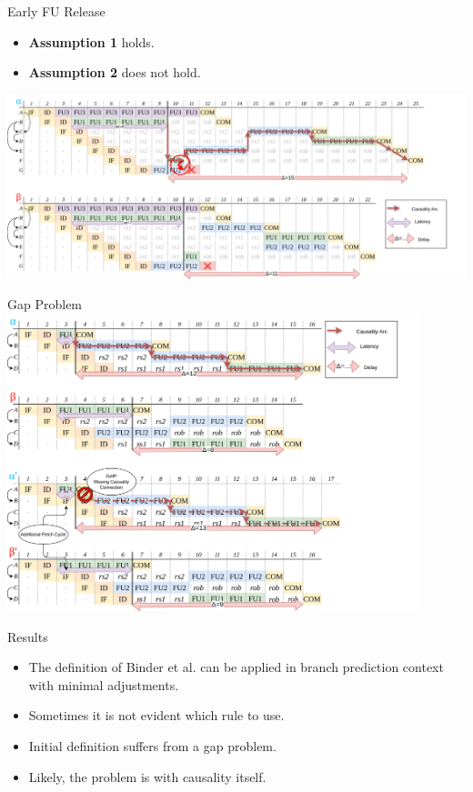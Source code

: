 \documentclass{beamer}
\begin{document}
\begin{frame}{Early FU Release}
    \begin{itemize}
        \item \textbf{Assumption 1} holds.
        \item \textbf{Assumption 2} does not hold.
    \end{itemize}
    \includegraphics[width=\textwidth]{pic/lat-mispred.png}
\end{frame}

\begin{frame}{Gap Problem}
    \includegraphics[width=0.9\textwidth]{pic/gap-problem.png}
\end{frame}

\begin{frame}{Results}
    \begin{itemize}
        \item The definition of Binder et al. can be applied in branch prediction context with minimal adjustments.
        \item Sometimes it is not evident which rule to use.
        \item Initial definition suffers from a gap problem.
        \item Likely, the problem is with causality itself.
    \end{itemize}
\end{frame}
\end{document}
